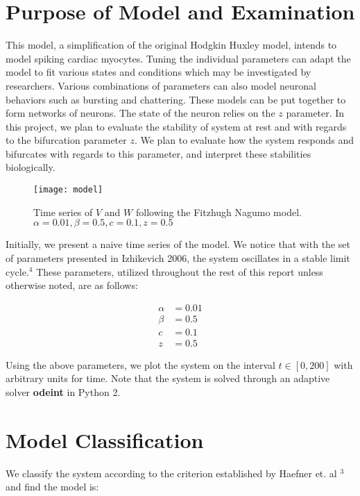 \documentclass[11pt]{report}
\begin{document}
\section{Purpose of Model and Examination}

This model, a simplification of the original Hodgkin Huxley model, intends to model spiking cardiac myocytes. Tuning the individual parameters can adapt the model to fit various states and conditions which may be investigated by researchers. Various combinations of parameters can also model neuronal behaviors such as bursting and chattering. These models can be put together to form networks of neurons. The state of the neuron relies on the $z$ parameter. 
In this project, we plan to evaluate the stability of system at rest and with regards to the bifurcation parameter $z$. We plan to evaluate how the system responds and bifurcates with regards to this parameter, and interpret these stabilities biologically. 


\begin{figure}[!ht]
  \caption{Time series of $V$ and $W$ following the Fitzhugh Nagumo model. $\alpha = 0.01, \beta = 0.5,c = 0.1,z = 0.5$}
  \centering
    \texttt{[image: model]}
\end{figure}

Initially, we present a naive time series of the model. We notice that with the set of parameters presented in Izhikevich 2006, the system oscillates in a stable limit cycle.$^4$ These parameters, utilized throughout the rest of this report unless otherwise noted, are as follows:

$$ \begin{aligned} \alpha &= 0.01 \\ \beta &= 0.5 \\ c &= 0.1 \\ z &= 0.5 \end{aligned} $$

Using the above parameters, we plot the system on the interval $t \in [0,200]$ with arbitrary units for time. Note that the system is solved through an adaptive solver \textbf{odeint} in Python 2. 


\section{Model Classification} %
\label{sub:model_classification}

We classify the system according to the criterion established by Haefner et. al $^{3}$ and find the model is:
\end{document}
